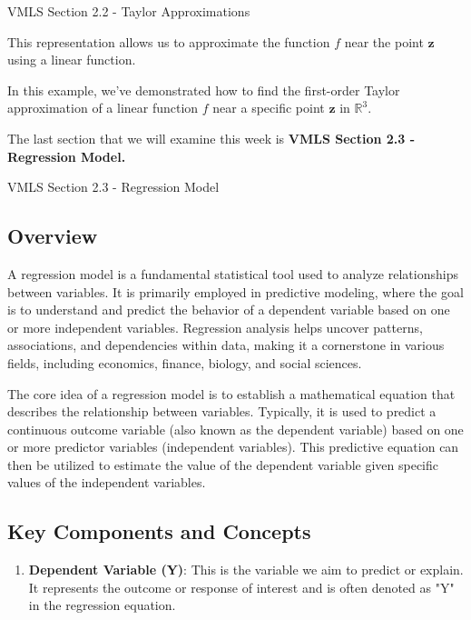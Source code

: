 \begin{notes}{VMLS Section 2.2 - Taylor Approximations}
\begin{Highlight}
        This representation allows us to approximate the function \(f\) near the point \(\mathbf{z}\) using a linear function.

        
        In this example, we've demonstrated how to find the first-order Taylor approximation of a linear function \(f\) near a specific point \(\mathbf{z}\) in \(\mathbb{R}^3\).
    \end{Highlight}
\end{notes}

The last section that we will examine this week is \textbf{VMLS Section 2.3 - Regression Model.}

\begin{notes}{VMLS Section 2.3 - Regression Model}
    \subsection*{Overview}

    A regression model is a fundamental statistical tool used to analyze relationships between variables. It is primarily employed in predictive modeling, where the goal is to understand and predict the behavior of a dependent variable based on 
    one or more independent variables. Regression analysis helps uncover patterns, associations, and dependencies within data, making it a cornerstone in various fields, including economics, finance, biology, and social sciences.
    
    The core idea of a regression model is to establish a mathematical equation that describes the relationship between variables. Typically, it is used to predict a continuous outcome variable (also known as the dependent variable) based on one 
    or more predictor variables (independent variables). This predictive equation can then be utilized to estimate the value of the dependent variable given specific values of the independent variables.
    
    \subsection*{Key Components and Concepts}
    
    \begin{enumerate}
        \item \textbf{Dependent Variable (Y)}: This is the variable we aim to predict or explain. It represents the outcome or response of interest and is often denoted as "Y" in the regression equation.
        

\end{enumerate}
\end{notes}
